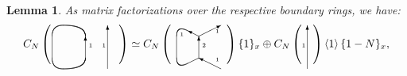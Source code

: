 \documentclass{amsart}
\theoremstyle{plain}
\newtheorem{lemma}[theorem]{Lemma}
\theoremstyle{definition}
\theoremstyle{remark}
\numberwithin{equation}{section}
\begin{document}
\begin{lemma}\label{lemma-MOY-decomps-KR}\cite{KR1}
As matrix factorizations over the respective boundary rings, we have: \vspace{1pc}
\begin{equation}\label{eq-MOY-I-KR}
C_N\left(
\setlength{\unitlength}{1pt}
\begin{picture}(61,20)(-31,20)

\put(0,10){\vector(0,1){20}}

\put(-30,10){\line(0,1){20}}

\qbezier(0,30)(0,40)(-20,40)

\qbezier(-30,30)(-30,40)(-20,40)

\qbezier(0,10)(0,0)(-20,0)

\qbezier(-30,10)(-30,0)(-20,0)

\put(20,0){\vector(0,1){40}}

\put(3,20){\tiny{$1$}}

\put(15,20){\tiny{$1$}}

\end{picture}
\right) \simeq C_N\left(
\setlength{\unitlength}{1pt}
\begin{picture}(50,20)(-25,20)

\put(-10,5){\line(2,1){10}}

\put(20,0){\vector(-2,1){20}}

\put(0,30){\vector(-2,1){10}}

\put(0,30){\vector(2,1){20}}

\put(0,10){\vector(0,1){20}}

\qbezier(-10,35)(-20,40)(-20,30)

\qbezier(-10,5)(-20,0)(-20,10)

\put(-20,10){\line(0,1){20}}

\put(15,7){\tiny{$1$}}

\put(-17,30){\tiny{$1$}}

\put(15,33){\tiny{$1$}}

\put(3,20){\tiny{${2}$}}

\end{picture}
\right)\{1\}_x \oplus C_N\left(
\setlength{\unitlength}{1pt}
\begin{picture}(10,20)(15,20)

\put(20,0){\vector(0,1){40}}

\put(15,20){\tiny{$1$}}

\end{picture}\right)\left\langle 1\right\rangle\{1-N\}_x,
\end{equation}


\end{lemma}
\end{document}
